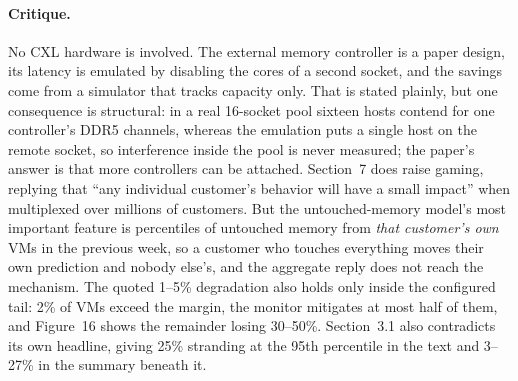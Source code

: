\paragraph{Critique.}
No CXL hardware is involved. The external memory controller is a paper design, its
latency is emulated by disabling the cores of a second socket, and the savings come from
a simulator that tracks capacity only. That is stated plainly, but one consequence is
structural: in a real 16-socket pool sixteen hosts contend for one
controller's DDR5 channels, whereas the emulation puts a single host on the remote
socket, so interference inside the pool is never measured; the paper's answer is that
more controllers can be attached. Section~7 does raise gaming, replying that ``any
individual customer's behavior will have a small impact'' when multiplexed over millions
of customers. But the untouched-memory model's
most important feature is percentiles of untouched memory from \emph{that customer's own}
VMs in the previous week, so a customer who touches everything moves their own prediction
and nobody else's, and the aggregate reply does not reach the mechanism. The quoted
1--5\% degradation also holds only inside the configured tail: 2\% of VMs exceed the
margin, the monitor mitigates at most half of them, and Figure~16 shows the remainder
losing 30--50\%. Section~3.1 also contradicts its own headline, giving 25\% stranding at
the 95th percentile in the text and 3--27\% in the summary beneath it.
